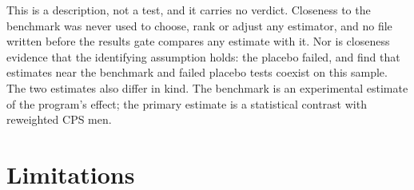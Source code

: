 \documentclass[11pt]{article}
\begin{document}
This is a description, not a test, and it carries no verdict. Closeness to the benchmark was
never used to choose, rank or adjust any estimator, and no file written before the results
gate compares any estimate with it. Nor is closeness evidence that the identifying assumption
holds: the placebo failed, and \citet{imbens2025} find that estimates near the benchmark and
failed placebo tests coexist on this sample. The two estimates also differ in kind. The
benchmark is an experimental estimate of the program's effect; the primary estimate is a
statistical contrast with reweighted CPS men.

\section{Limitations}
\label{sec:limitations}
\end{document}
